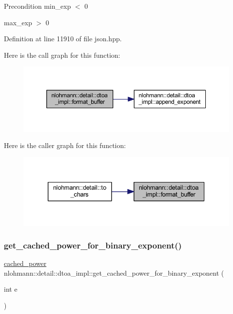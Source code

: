 \begin{DoxyPrecond}{Precondition}
min\+\_\+exp $<$ 0 

max\+\_\+exp $>$ 0 
\end{DoxyPrecond}


Definition at line 11910 of file json.\+hpp.

Here is the call graph for this function\+:
\nopagebreak
\begin{figure}[H]
\begin{center}
\leavevmode
\includegraphics[width=350pt]{namespacenlohmann_1_1detail_1_1dtoa__impl_a12c1c5d8b46ba9702186445e73f86afe_cgraph}
\end{center}
\end{figure}
Here is the caller graph for this function\+:
\nopagebreak
\begin{figure}[H]
\begin{center}
\leavevmode
\includegraphics[width=331pt]{namespacenlohmann_1_1detail_1_1dtoa__impl_a12c1c5d8b46ba9702186445e73f86afe_icgraph}
\end{center}
\end{figure}
\mbox{\label{namespacenlohmann_1_1detail_1_1dtoa__impl_adbf329a18c5cf854a3477327afd2200b}} 
\subsubsection{\texorpdfstring{get\_cached\_power\_for\_binary\_exponent()}{get\_cached\_power\_for\_binary\_exponent()}}
{\footnotesize\ttfamily \mbox{\hyperlink{structnlohmann_1_1detail_1_1dtoa__impl_1_1cached__power}{cached\+\_\+power}} nlohmann\+::detail\+::dtoa\+\_\+impl\+::get\+\_\+cached\+\_\+power\+\_\+for\+\_\+binary\+\_\+exponent (\begin{DoxyParamCaption}\item[{int}]{e }\end{DoxyParamCaption})\hspace{0.3cm}{\ttfamily [inline]}}

